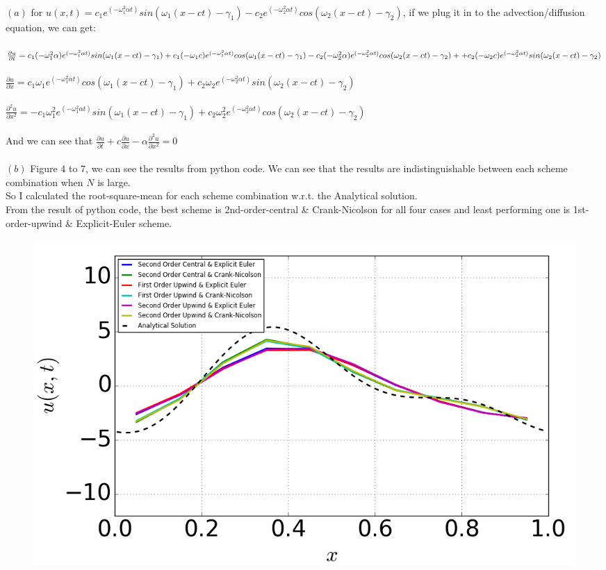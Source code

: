 \documentclass[12pt]{article}
\newenvironment{problem}[2][Problem]{\begin{trivlist}
\item[\hskip \labelsep {\bfseries #1}\hskip \labelsep {\bfseries #2.}]}{\end{trivlist}}
\begin{document}
\begin{problem}{2}
\text{}\\
$(a)$ for $u(x,t) = c_{1}e^{(-\omega_1^{2} \alpha t)}sin(\omega_{1}(x-ct)-\gamma_{1}) - c_{2}e^{(-\omega_2^{2} \alpha t)}cos(\omega_{2}(x-ct)-\gamma_{2})$, if we plug it in to the advection/diffusion equation, we can get:\\
\\
$\frac{\partial u}{\partial t} =  c_{1}(-\omega_{1}^2 \alpha)e^{(-\omega_1^{2} \alpha t)}sin(\omega_{1}(x-ct)-\gamma_{1}) + c_{1}(-\omega_1 c)e^{(-\omega_1^{2} \alpha t)}cos(\omega_{1}(x-ct)-\gamma_{1}) -\\c_{2}(-\omega_{2}^2 \alpha)e^{(-\omega_2^{2} \alpha t)}cos(\omega_{2}(x-ct)-\gamma_{2}) + + c_{2}(-\omega_2 c)e^{(-\omega_2^{2} \alpha t)}sin(\omega_{2}(x-ct)-\gamma_{2})$\\
\\
$\frac{\partial u}{\partial x} =  c_{1} \omega_{1}e^{(-\omega_1^{2} \alpha t)}cos(\omega_{1}(x-ct)-\gamma_{1}) + c_{2} \omega_{2}e^{(-\omega_2^{2} \alpha t)}sin(\omega_{2}(x-ct)-\gamma_{2})$\\
\\
$\frac{\partial^2 u}{\partial x^2} =  -c_{1} \omega_{1}^2 e^{(-\omega_1^{2} \alpha t)}sin(\omega_{1}(x-ct)-\gamma_{1}) + c_{2} \omega_{2}^2 e^{(-\omega_2^{2} \alpha t)}cos(\omega_{2}(x-ct)-\gamma_{2})$\\
\\
And we can see that $\frac{\partial u}{\partial t} + c \frac{\partial u}{\partial x} - \alpha \frac{\partial^2 u}{\partial x^2} = 0$\\
\text{}\\
$(b)$ Figure 4 to 7, we can see the results from python code.  We can see that the results are indistinguishable between each scheme combination when $N$ is large.\\
So I calculated the root-square-mean for each scheme combination w.r.t. the Analytical solution.\\
From the result of python code, the best scheme is 2nd-order-central \& Crank-Nicolson for all four cases and least performing one is 1st-order-upwind \& Explicit-Euler scheme.\\
\begin{figure}[H]
\centering
  \includegraphics[scale=0.65]{p2b_n10.png}

\end{figure}
\end{problem}
\end{document}
